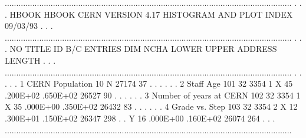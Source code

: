 \begin{Listing}
 .............................................................................................................................
 .                                                                                                                           .
 .   HBOOK   HBOOK  CERN            VERSION   4.17       HISTOGRAM AND PLOT INDEX                             09/03/93       .
 .                                                                                                                           .
 .............................................................................................................................
 .                                                                                                                           .
 .  NO                     TITLE                      ID  B/C  ENTRIES DIM   NCHA     LOWER       UPPER       ADDRESS LENGTH .
 .                                                                                                                           .
 .............................................................................................................................
 .                                                                                                                           .
 .                                                                                                                           .
 .   1  CERN Population                               10               N                                        27174     37 .
 .                                                                                                                           .
 .                                                                                                                           .
 .   2  Staff Age                                    101  32     3354  1  X    45    .200E+02    .650E+02       26527     90 .
 .                                                                                                                           .
 .                                                                                                                           .
 .   3  Number of years at CERN                      102  32     3354  1  X    35    .000E+00    .350E+02       26432     83 .
 .                                                                                                                           .
 .                                                                                                                           .
 .   4  Grade vs. Step                               103  32     3354  2  X    12    .300E+01    .150E+02       26347    298 .
 .                                                                        Y    16    .000E+00    .160E+02       26074    264 .
 .                                                                                                                           .
 .............................................................................................................................


\end{Listing}

